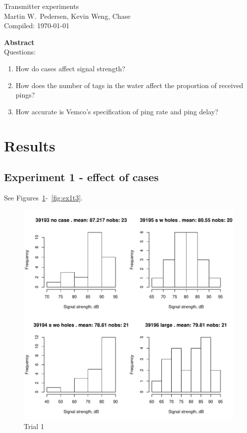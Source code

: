 \documentclass{article}
\begin{document}
\begin{center}
\Large Transmitter experiments\\ \normalsize
Martin W.\ Pedersen, Kevin Weng, Chase\\
Compiled: \today  
\end{center}

\textbf{Abstract}\\
Questions: 
\begin{enumerate}
\item How do cases affect signal strength?
\item How does the number of tags in the water affect the proportion of received pings?
\item How accurate is Vemco's specification of ping rate and ping delay?
\end{enumerate}

 
\section{Results}
\label{sec:results}

\subsection{Experiment 1 - effect of cases}

See Figures~\ref{fig:ex1t1}-~\ref{fig:ex1t3}.

\begin{figure}
  \begin{center}
    \includegraphics[trim=0cm 0cm 0cm 0cm,clip,angle=0,width=1\textwidth]{experiment1/casesTrial1.pdf}
  \end{center}
  \caption{Trial 1}
\label{fig:ex1t1}
\end{figure}
\end{document}
